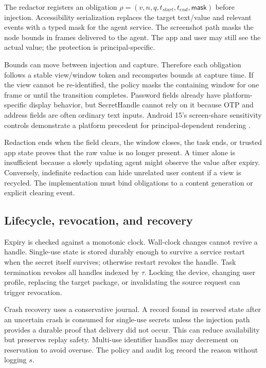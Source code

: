 The redactor registers an obligation $\rho=(v,n,q,t_{start},t_{end},\mathsf{mask})$ before injection. Accessibility serialization replaces the target text/value and relevant events with a typed mask for the agent service. The screenshot path masks the node bounds in frames delivered to the agent. The app and user may still see the actual value; the protection is principal-specific.

Bounds can move between injection and capture. Therefore each obligation follows a stable view/window token and recomputes bounds at capture time. If the view cannot be re-identified, the policy masks the containing window for one frame or until the transition completes. Password fields already have platform-specific display behavior, but SecretHandle cannot rely on it because OTP and address fields are often ordinary text inputs. Android 15's screen-share sensitivity controls demonstrate a platform precedent for principal-dependent rendering \cite{android15privacy,androidSecureFlag}.

Redaction ends when the field clears, the window closes, the task ends, or trusted app state proves that the raw value is no longer present. A timer alone is insufficient because a slowly updating agent might observe the value after expiry. Conversely, indefinite redaction can hide unrelated user content if a view is recycled. The implementation must bind obligations to a content generation or explicit clearing event.

\subsection{Lifecycle, revocation, and recovery}

Expiry is checked against a monotonic clock. Wall-clock changes cannot revive a handle. Single-use state is stored durably enough to survive a service restart when the secret itself survives; otherwise restart revokes the handle. Task termination revokes all handles indexed by $\tau$. Locking the device, changing user profile, replacing the target package, or invalidating the source request can trigger revocation.

Crash recovery uses a conservative journal. A record found in reserved state after an uncertain crash is consumed for single-use secrets unless the injection path provides a durable proof that delivery did not occur. This can reduce availability but preserves replay safety. Multi-use identifier handles may decrement on reservation to avoid overuse. The policy and audit log record the reason without logging $s$.

